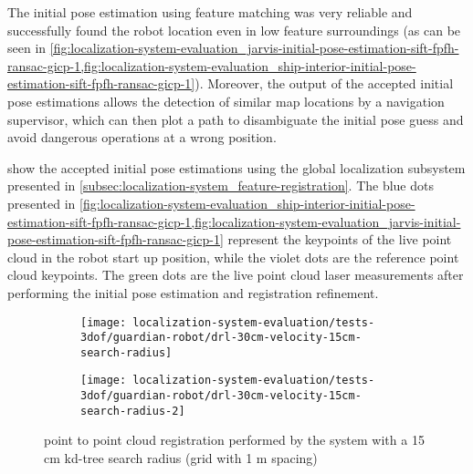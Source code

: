 The initial pose estimation using feature matching was very reliable and successfully found the robot location even in low feature surroundings (as can be seen in \cref{fig:localization-system-evaluation_jarvis-initial-pose-estimation-sift-fpfh-ransac-gicp-1,fig:localization-system-evaluation_ship-interior-initial-pose-estimation-sift-fpfh-ransac-gicp-1}). Moreover, the output of the accepted initial pose estimations allows the detection of similar map locations by a navigation supervisor, which can then plot a path to disambiguate the initial pose guess and avoid dangerous operations at a wrong position.

 show the accepted initial pose estimations using the global localization subsystem presented in \cref{subsec:localization-system_feature-registration}. The blue dots presented in \cref{fig:localization-system-evaluation_ship-interior-initial-pose-estimation-sift-fpfh-ransac-gicp-1,fig:localization-system-evaluation_jarvis-initial-pose-estimation-sift-fpfh-ransac-gicp-1} represent the keypoints of the live point cloud in the robot start up position, while the violet dots are the reference point cloud keypoints. The green dots are the live point cloud laser measurements after performing the initial pose estimation and registration refinement.

\begin{figure}[H]
	\centering
	\begin{subfigure}[ht]{0.425\textwidth}
		\centering
		\texttt{[image: localization-system-evaluation/tests-3dof/guardian-robot/drl-30cm-velocity-15cm-search-radius]}
	\end{subfigure}
	\begin{subfigure}[ht]{0.425\textwidth}
		\centering
		\texttt{[image: localization-system-evaluation/tests-3dof/guardian-robot/drl-30cm-velocity-15cm-search-radius-2]}
	\end{subfigure}
	\caption{ point to point cloud registration performed by the  system with a 15 cm kd-tree search radius (grid with 1 m spacing)}
	\label{fig:localization-system-evaluation_guardian-drl-30cm-velocity-15cm-search-radius}
\end{figure}

